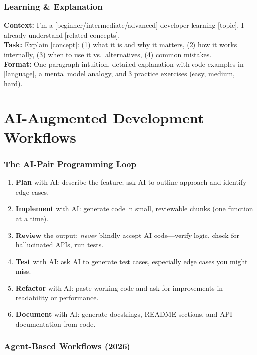 \documentclass[11pt, a4paper, oneside]{report}
\begin{document}
\subsubsection{Learning \& Explanation}

\begin{promptbox}[title={Template: Concept Explanation}]
\textbf{Context:} I'm a [beginner/intermediate/advanced] developer learning [topic]. I already understand [related concepts].\\[4pt]
\textbf{Task:} Explain [concept]: (1) what it is and why it matters, (2) how it works internally, (3) when to use it vs.\ alternatives, (4) common mistakes.\\[4pt]
\textbf{Format:} One-paragraph intuition, detailed explanation with code examples in [language], a mental model analogy, and 3 practice exercises (easy, medium, hard).
\end{promptbox}

\section[AI-Augmented Workflows]{AI-Augmented Development Workflows}

\subsubsection{The AI-Pair Programming Loop}

\begin{enumerate}[leftmargin=*]
\item \textbf{Plan} with AI: describe the feature; ask AI to outline approach and identify edge cases.
\item \textbf{Implement} with AI: generate code in small, reviewable chunks (one function at a time).
\item \textbf{Review} the output: \emph{never} blindly accept AI code---verify logic, check for hallucinated APIs, run tests.
\item \textbf{Test} with AI: ask AI to generate test cases, especially edge cases you might miss.
\item \textbf{Refactor} with AI: paste working code and ask for improvements in readability or performance.
\item \textbf{Document} with AI: generate docstrings, README sections, and API documentation from code.
\end{enumerate}

\subsubsection{Agent-Based Workflows (2026)}
\end{document}
